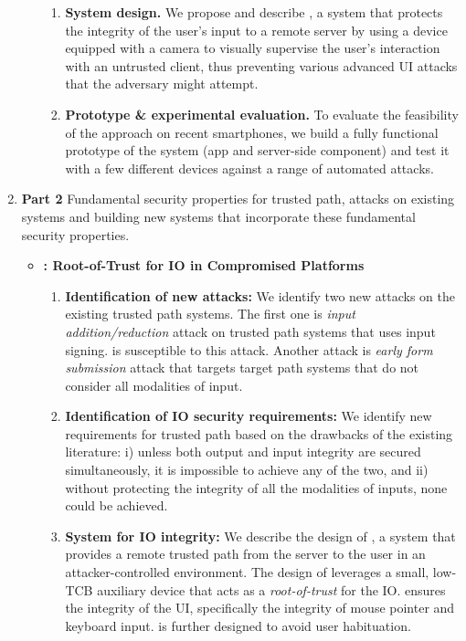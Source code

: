 \begin{enumerate}[leftmargin=*]
\begin{itemize}
\begin{enumerate}
	\item \textbf{System design.}
	We propose and describe \integriscreen, a system that protects the integrity of the user's input to a remote server by using a device equipped with a camera to visually supervise the user's interaction with an untrusted client, thus preventing various advanced UI attacks that the adversary might attempt.

	\item \textbf{Prototype \& experimental evaluation.}
	To evaluate the feasibility of the approach on recent smartphones, we build a fully functional prototype of the \integriscreen system (\integriscreen app and \integriscreen{} server-side component) and test it with a few different devices against a range of automated attacks.

	
\end{enumerate}
\end{itemize}


\item[] \textbf{Part 2} Fundamental security properties for trusted path, attacks on existing systems and building new systems that incorporate these fundamental security properties. 

\begin{itemize}
    \item \textbf{\protection: Root-of-Trust for IO in Compromised Platforms}
    \begin{enumerate}
      
      	\item \textbf{Identification of new attacks:} We identify two new attacks on the existing trusted path systems. The first one is \emph{input addition/reduction} attack on trusted path systems that uses input signing. \integrikey is susceptible to this attack. Another attack is \emph{early form submission} attack that targets target path systems that do not consider all modalities of input.
      	 
        \item  \textbf{Identification of IO security requirements:} We identify new requirements for trusted path based on the drawbacks of the existing literature: i) unless both output and input integrity are secured simultaneously, it is impossible to achieve any of the two, and ii) without protecting the integrity of all the modalities of inputs, none could be achieved.
        
        \item \textbf{System for IO integrity:} We describe the design of \protection, a system that provides a remote trusted path from the server to the user in an attacker-controlled environment. The design of \protection leverages a small, low-TCB auxiliary device that acts as a \emph{root-of-trust} for the IO. \protection ensures the integrity of the UI, specifically the integrity of mouse pointer and keyboard input. \protection is further designed to avoid user habituation.
        

\end{enumerate}
\end{itemize}
\end{enumerate}
